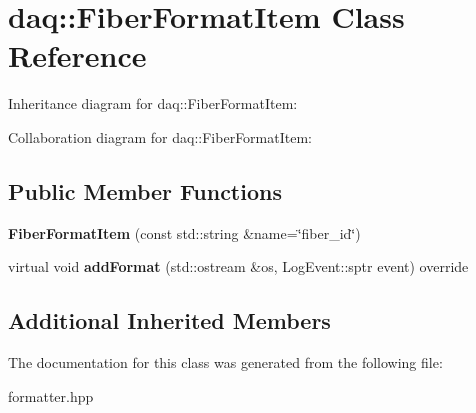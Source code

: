 \hypertarget{classdaq_1_1FiberFormatItem}{}\section{daq\+:\+:Fiber\+Format\+Item Class Reference}
\label{classdaq_1_1FiberFormatItem}


Inheritance diagram for daq\+:\+:Fiber\+Format\+Item\+:


Collaboration diagram for daq\+:\+:Fiber\+Format\+Item\+:
\subsection*{Public Member Functions}
\begin{DoxyCompactItemize}
\item 
\mbox{\label{classdaq_1_1FiberFormatItem_ada1ac527accfb11f7d1eb228bc50c63f}} 
{\bfseries Fiber\+Format\+Item} (const std\+::string \&name=\char`\"{}fiber\+\_\+id\char`\"{})
\item 
\mbox{\label{classdaq_1_1FiberFormatItem_a3a67e1069b63dae3492602cc29e43eb8}} 
virtual void {\bfseries add\+Format} (std\+::ostream \&os, Log\+Event\+::sptr event) override
\end{DoxyCompactItemize}
\subsection*{Additional Inherited Members}


The documentation for this class was generated from the following file\+:\begin{DoxyCompactItemize}
\item 
formatter.\+hpp\end{DoxyCompactItemize}
